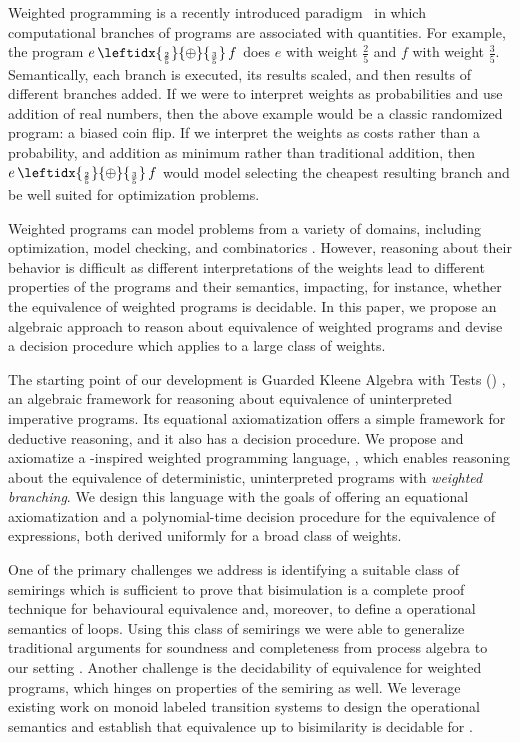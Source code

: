 \documentclass[a4paper,UKenglish,cleveref, autoref, thm-restate]{lipics-v2021}
\newcommand{\WC}[2]{\,\leftidx{_{#1}}{{\oplus}}{_{#2}}\,}
\newcommand{\wgkat}{\textsf{\upshape{wGKAT}}\xspace}
\newcommand{\gkat}{\textsf{\upshape{GKAT}}\xspace}
\theoremstyle{plain}\newtheoremrep{thm}{Theorem}[section]
\begin{document}
		Weighted programming is a recently introduced paradigm~\cite{batz2022weighted} in which computational branches of programs are associated with quantities. For example, the program $e \WC{\frac25}{\frac35} f$ does $e$ with weight $\frac25$ and $f$ with weight $\frac35$. Semantically, each branch is executed, its results scaled, and then results of different branches added. If we were to interpret weights as probabilities and use addition of real numbers, then the above example would be a classic randomized program: a biased coin flip. If we interpret the weights as costs rather than a probability, and addition as minimum rather than traditional addition, then $e \WC{\frac25}{\frac35} f$ would model selecting the cheapest resulting branch and be well suited for optimization problems.	
			
		Weighted programs can model problems from a variety of domains, including optimization, model checking, and combinatorics \cite{batz2022weighted}. However, reasoning about their behavior is difficult as different interpretations of the weights lead to different properties of the programs and their semantics, impacting, for instance, whether the equivalence of weighted programs is decidable. In this paper, we propose an algebraic approach to reason about equivalence of weighted programs and devise a decision procedure which applies to a large class of weights. 
		
		The starting point of our development is Guarded Kleene Algebra with Tests (\gkat) \cite{Smolka_2019}, an algebraic framework for reasoning about equivalence of uninterpreted imperative programs. Its equational axiomatization offers a simple framework for deductive reasoning, and it also has a decision procedure. We propose and axiomatize a \gkat-inspired weighted programming language, \wgkat, which enables reasoning about the equivalence of deterministic, uninterpreted programs with {\em weighted branching}. We design this language with the goals of offering an equational axiomatization and a polynomial-time decision procedure for the equivalence of expressions, both derived uniformly for a broad class of weights.
		
		One of the primary challenges we address is identifying a suitable class of semirings which is sufficient to prove that bisimulation is a complete proof technique for behavioural equivalence and, moreover, to define a operational semantics of loops. Using this class of semirings we were able to generalize traditional arguments for soundness and completeness from process algebra to our setting \cite{ToddThesis}. Another challenge is the decidability of equivalence for weighted programs, which hinges on properties of the semiring as well. We leverage existing work on monoid labeled transition systems to design the operational semantics and establish that equivalence up to bisimilarity is decidable for \wgkat.
		
\end{document}
